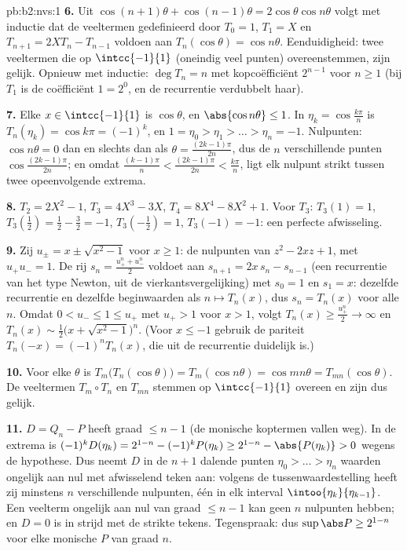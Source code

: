 \begin{solution}{pb:b2:nvs:1}
\textbf{6.} Uit $\cos(n{+}1)\theta + \cos(n{-}1)\theta =
2\cos\theta\cos n\theta$ volgt met inductie dat de veeltermen
gedefinieerd door $T_0 = 1$, $T_1 = X$ en $T_{n+1} = 2XT_n -
T_{n-1}$ voldoen aan $T_n(\cos\theta) = \cos n\theta$.
Eenduidigheid: twee veeltermen die op $\intcc{-1}{1}$ (oneindig
veel punten) overeenstemmen, zijn gelijk. Opnieuw met inductie:
$\deg T_n = n$ met kopcoëfficiënt $2^{n-1}$ voor $n \geq 1$ (bij
$T_1$ is de coëfficiënt $1 = 2^0$, en de recurrentie verdubbelt
haar).

\textbf{7.} Elke $x \in \intcc{-1}{1}$ is $\cos\theta$, en
$\abs{\cos n\theta} \leq 1$. In $\eta_k = \cos\frac{k\pi}n$ is
$T_n(\eta_k) = \cos k\pi = (-1)^k$, en $1 = \eta_0 > \eta_1 > \dots
> \eta_n = -1$. Nulpunten: $\cos n\theta = 0$ dan en slechts dan
als $\theta = \frac{(2k-1)\pi}{2n}$, dus de $n$ verschillende
punten $\cos\frac{(2k-1)\pi}{2n}$; en omdat $\frac{(k-1)\pi}n <
\frac{(2k-1)\pi}{2n} < \frac{k\pi}n$, ligt elk nulpunt strikt
tussen twee opeenvolgende extrema.

\textbf{8.} $T_2 = 2X^2 - 1$, $T_3 = 4X^3 - 3X$, $T_4 = 8X^4 - 8X^2
+ 1$. Voor $T_3$: $T_3(1) = 1$, $T_3(\tfrac12) = \tfrac12 -
\tfrac32 = -1$, $T_3(-\tfrac12) = 1$, $T_3(-1) = -1$: een perfecte
afwisseling.

\textbf{9.} Zij $u_\pm = x \pm \sqrt{x^2 - 1}$ voor $x \geq 1$: de
nulpunten van $z^2 - 2xz + 1$, met $u_+u_- = 1$. De rij $s_n =
\frac{u_+^n + u_-^n}2$ voldoet aan $s_{n+1} = 2x\,s_n - s_{n-1}$
(een recurrentie van het type Newton, uit de vierkantsvergelijking)
met $s_0 = 1$ en $s_1 = x$: dezelfde recurrentie en dezelfde
beginwaarden als $n \mapsto T_n(x)$, dus $s_n = T_n(x)$ voor alle
$n$. Omdat $0 < u_- \leq 1 \leq u_+$ met $u_+ > 1$ voor $x > 1$,
volgt $T_n(x) \geq \frac{u_+^n}2 \to \infty$ en $T_n(x) \sim
\frac12\bigl(x + \sqrt{x^2-1}\bigr)^n$. (Voor $x \leq -1$ gebruik
de pariteit $T_n(-x) = (-1)^nT_n(x)$, die uit de recurrentie
duidelijk is.)

\textbf{10.} Voor elke $\theta$ is
$T_m\bigl(T_n(\cos\theta)\bigr) = T_m(\cos n\theta) = \cos
mn\theta = T_{mn}(\cos\theta)$. De veeltermen $T_m \circ T_n$ en
$T_{mn}$ stemmen op $\intcc{-1}{1}$ overeen en zijn dus gelijk.

\textbf{11.} $D = Q_n - P$ heeft graad $\leq n - 1$ (de monische
koptermen vallen weg). In de extrema is $(-1)^kD(\eta_k) = 2^{1-n}
- (-1)^kP(\eta_k) \geq 2^{1-n} - \abs{P(\eta_k)} > 0$ wegens de
hypothese. Dus neemt $D$ in de $n + 1$ dalende punten $\eta_0 >
\dots > \eta_n$ waarden ongelijk aan nul met afwisselend teken aan:
volgens de tussenwaardestelling heeft zij minstens $n$
verschillende nulpunten, één in elk  interval
$\intoo{\eta_{k}}{\eta_{k-1}}$. Een veelterm ongelijk aan nul van
graad $\leq n - 1$ kan geen $n$ nulpunten hebben; en $D = 0$ is in
strijd met de strikte tekens. Tegenspraak: dus $\sup\abs P \geq
2^{1-n}$ voor elke monische $P$ van graad $n$.


\end{solution}
